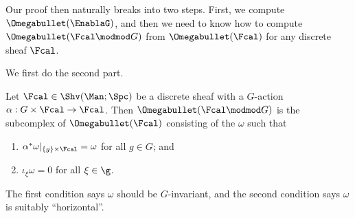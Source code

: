 Our proof then naturally breaks into two steps. First, we compute $\Omegabullet(\EnablaG)$, and then we need to know how to compute $\Omegabullet(\Fcal\modmod G)$ from $\Omegabullet (\Fcal)$ for any discrete sheaf $\Fcal$.

We first do the second part.

\begin{lemma}\label{lemma:omega-mod-g}
  Let $\Fcal \in \Shv(\Man;\Spc)$ be a discrete sheaf with a $G$-action $\alpha: G \times \Fcal \to \Fcal$. Then $\Omegabullet(\Fcal \modmod G)$ is the subcomplex of $\Omegabullet(\Fcal)$ consisting of the $\omega$ such that
  \begin{enumerate}[{\upshape (1)}]
    \item $\alpha^* \omega|_{\{g\} \times \Fcal} = \omega$ for all $g \in G$; and

    \item $\iota_\xi \omega = 0$ for all $\xi \in\g$.
  \end{enumerate}
\end{lemma}
The first condition says $\omega$ should be $G$-invariant, and the second condition says $\omega$ is suitably ``horizontal''.

